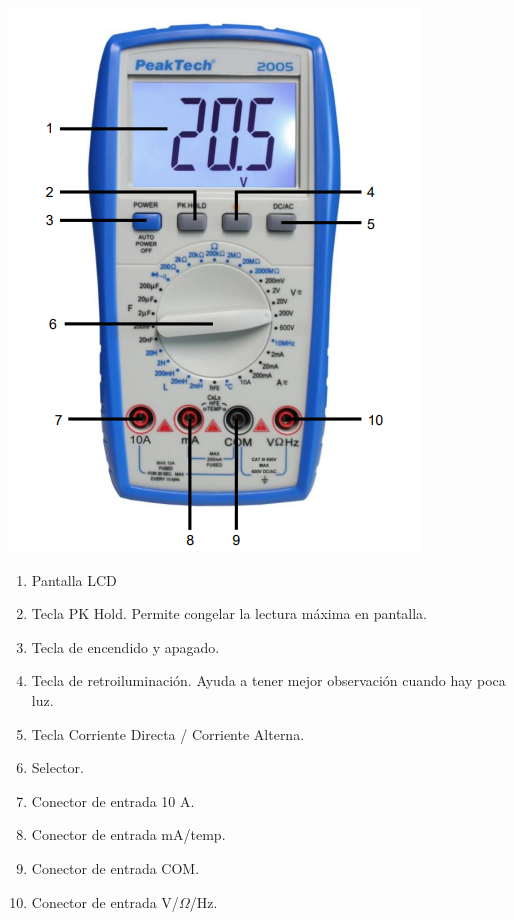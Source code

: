\documentclass[10pt]{article}
\begin{document}
\begin{multicols}{2}
\begin{center}
	\includegraphics[scale = 0.5]{Imagenes/Marco/Multimetro.PNG}\\
	\begin{enumerate}
		\item Pantalla LCD
		\item Tecla PK Hold. Permite congelar la lectura máxima en pantalla.
		\item Tecla de encendido y apagado. 
		\item Tecla de retroiluminación. Ayuda a tener mejor observación cuando hay poca luz.
		\item Tecla Corriente Directa / Corriente Alterna.
		\item Selector.
		\item Conector de entrada 10 A.
		\item Conector de entrada mA/temp.
		\item Conector de entrada COM.
		\item Conector de entrada V/$\Omega$/Hz.
	\end{enumerate}
\end{center}



\end{multicols}
\end{document}
